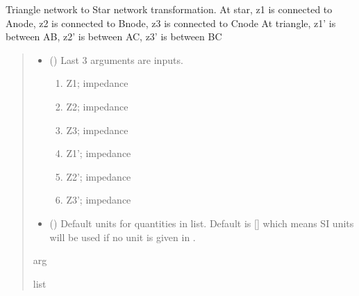 \documentclass[letterpaper,10pt,english]{sphinxmanual}
\begin{document}

\begin{fulllineitems}
\label{\detokenize{components:components.Triangle2StarTransformation}}
\pysigstartsignatures
{}
\pysigstopsignatures
\sphinxAtStartPar
Triangle network to Star network transformation.
At star, z1 is connected to A\sphinxhyphen{}node, z2 is connected to B\sphinxhyphen{}node, z3 is connected to C\sphinxhyphen{}node
At triangle, z1’ is between A\sphinxhyphen{}B, z2’ is between A\sphinxhyphen{}C, z3’ is between B\sphinxhyphen{}C
\begin{quote}\begin{description}
\begin{itemize}
\item {}
\sphinxAtStartPar
{} () \textendash{}
\sphinxAtStartPar
Last 3 arguments are inputs.
\begin{enumerate}
%
\item {}
\sphinxAtStartPar
Z1; impedance

\item {}
\sphinxAtStartPar
Z2; impedance

\item {}
\sphinxAtStartPar
Z3; impedance

\item {}
\sphinxAtStartPar
Z1’; impedance

\item {}
\sphinxAtStartPar
Z2’; impedance

\item {}
\sphinxAtStartPar
Z3’; impedance

\end{enumerate}


\item {}
\sphinxAtStartPar
{} (\sphinxstyleliteralemphasis{\sphinxupquote{, }}) \textendash{} Default units for quantities in  list. Default is {[}{]} which means SI units will be used if no unit is given in .

\end{itemize}

\sphinxAtStartPar
arg

\sphinxAtStartPar
list

\end{description}\end{quote}

\end{fulllineitems}
\end{document}
